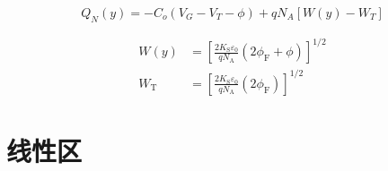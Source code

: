 \documentclass[cn,11pt,chinese,black,simple]{../elegantbook}
\begin{document}
\[Q_{N}(y)=-C_{o}\left(V_{G}-V_{T}-\phi\right)+q N_{A}\left[W(y)-W_{T}\right]\]


\[\begin{aligned}
    W(y) &=\left[\frac{2 K_{\mathrm{S}} \varepsilon_{0}}{q N_{\mathrm{A}}}\left(2 \phi_{\mathrm{F}}+\phi\right)\right]^{1 / 2} \\
    W_{\mathrm{T}} &=\left[\frac{2 K_{\mathrm{S}} \varepsilon_{0}}{q N_{\mathrm{A}}}\left(2 \phi_{\mathrm{F}}\right)\right]^{1 / 2}
\end{aligned}\]

\section{线性区}


\let\chapname\undefined
\ifx\mainclass\undefined
\end{document}
